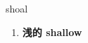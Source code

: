 
\begin{frame}
{\huge shoal}
\begin{center}
\begin{enumerate}\Large
  \item \textbf{浅的 shallow}
\end{enumerate}
\end{center}
\end{frame}
